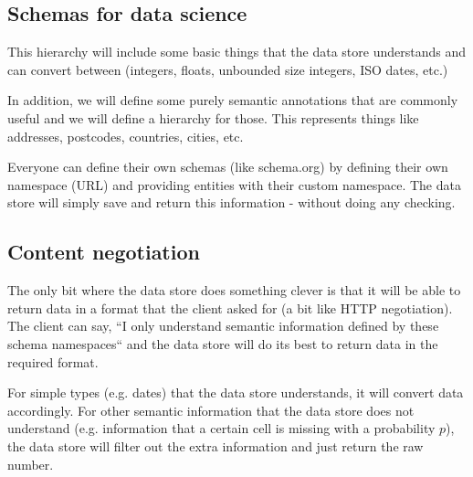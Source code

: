 \documentclass[sigplan,preprint,10pt]{acmart}\settopmatter{printfolios=true,printccs=false,printacmref=false}
\theoremstyle{plain}
\theoremstyle{definition}
\begin{document}
\subsection{Schemas for data science}
{\color{red}
This hierarchy will include some basic things that the data store understands and can 
convert between (integers, floats, unbounded size integers, ISO dates, etc.)

In addition, we will define some purely semantic annotations that are commonly useful and 
we will define a hierarchy for those. This represents things like addresses, postcodes, countries,
cities, etc.

Everyone can define their own schemas (like schema.org) by defining their own namespace (URL)
and providing entities with their custom namespace. The data store will simply save and return
this information - without doing any checking.}

\subsection{Content negotiation}
{\color{red}
The only bit where the data store does something clever is that it will be able to return data
in a format that the client asked for (a bit like HTTP negotiation). The client can say, ``I only
understand semantic information defined by these schema namespaces`` and the data store will do
its best to return data in the required format.

For simple types (e.g. dates) that the data store understands, it will convert data accordingly.
For other semantic information that the data store does not understand (e.g. information that
a certain cell is missing with a probability $p$), the data store will filter out the extra
information and just return the raw number.
}
\end{document}
